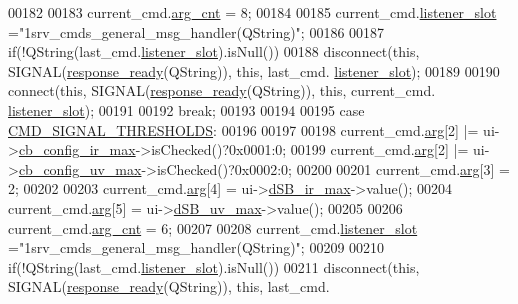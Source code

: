 \begin{DoxyCode}
00182 
00183             current\_cmd.\hyperlink{a00004_affcea772a1bc5362ebbc274b6166f81b}{arg\_cnt}         = 8;
00184 
00185             current\_cmd.\hyperlink{a00004_abb76d8edb39876deb60975c8fd784b3f}{listener\_slot}   =\textcolor{stringliteral}{"1srv\_cmds\_general\_msg\_handler(QString)"};
00186 
00187             \textcolor{keywordflow}{if}(!QString(last\_cmd.\hyperlink{a00004_abb76d8edb39876deb60975c8fd784b3f}{listener\_slot}).isNull())
00188             disconnect(\textcolor{keyword}{this}, SIGNAL(\hyperlink{a00017_a3f6396874778799cf07a7a0149e54977}{response\_ready}(QString)), \textcolor{keyword}{this}, last\_cmd.
      \hyperlink{a00004_abb76d8edb39876deb60975c8fd784b3f}{listener\_slot});
00189 
00190             connect(\textcolor{keyword}{this}, SIGNAL(\hyperlink{a00017_a3f6396874778799cf07a7a0149e54977}{response\_ready}(QString)), \textcolor{keyword}{this}, current\_cmd.
      \hyperlink{a00004_abb76d8edb39876deb60975c8fd784b3f}{listener\_slot});
00191 
00192         \textcolor{keywordflow}{break};
00193 
00194 
00195     \textcolor{keywordflow}{case} \hyperlink{a00086_ac361dc1b32c1036394be0fd7de1182ca}{CMD\_SIGNAL\_THRESHOLDS}:
00196 
00197 
00198             current\_cmd.\hyperlink{a00004_a56e6c2d7315d0ae60a51e8b140c9cfe4}{arg}[2] |= ui->\hyperlink{a00080_ae78fd3c777d081ab1ec1d0142bec3320}{cb\_config\_ir\_max}->isChecked()?0x0001:0;
00199             current\_cmd.\hyperlink{a00004_a56e6c2d7315d0ae60a51e8b140c9cfe4}{arg}[2] |= ui->\hyperlink{a00080_a13ce5fddc83683d7b8b717f0b9a4e2cf}{cb\_config\_uv\_max}->isChecked()?0x0002:0;
00200 
00201             current\_cmd.\hyperlink{a00004_a56e6c2d7315d0ae60a51e8b140c9cfe4}{arg}[3]  = 2;
00202 
00203             current\_cmd.\hyperlink{a00004_a56e6c2d7315d0ae60a51e8b140c9cfe4}{arg}[4]  = ui->\hyperlink{a00080_a220706f1fd93857145032c897e55d9e3}{dSB\_ir\_max}->value();
00204             current\_cmd.\hyperlink{a00004_a56e6c2d7315d0ae60a51e8b140c9cfe4}{arg}[5]  = ui->\hyperlink{a00080_aa2872ada374dace81c4f1cc41d8e244d}{dSB\_uv\_max}->value();
00205 
00206             current\_cmd.\hyperlink{a00004_affcea772a1bc5362ebbc274b6166f81b}{arg\_cnt} = 6;
00207 
00208             current\_cmd.\hyperlink{a00004_abb76d8edb39876deb60975c8fd784b3f}{listener\_slot} =\textcolor{stringliteral}{"1srv\_cmds\_general\_msg\_handler(QString)"};
00209 
00210             \textcolor{keywordflow}{if}(!QString(last\_cmd.\hyperlink{a00004_abb76d8edb39876deb60975c8fd784b3f}{listener\_slot}).isNull())
00211             disconnect(\textcolor{keyword}{this}, SIGNAL(\hyperlink{a00017_a3f6396874778799cf07a7a0149e54977}{response\_ready}(QString)), \textcolor{keyword}{this}, last\_cmd.

\end{DoxyCode}
